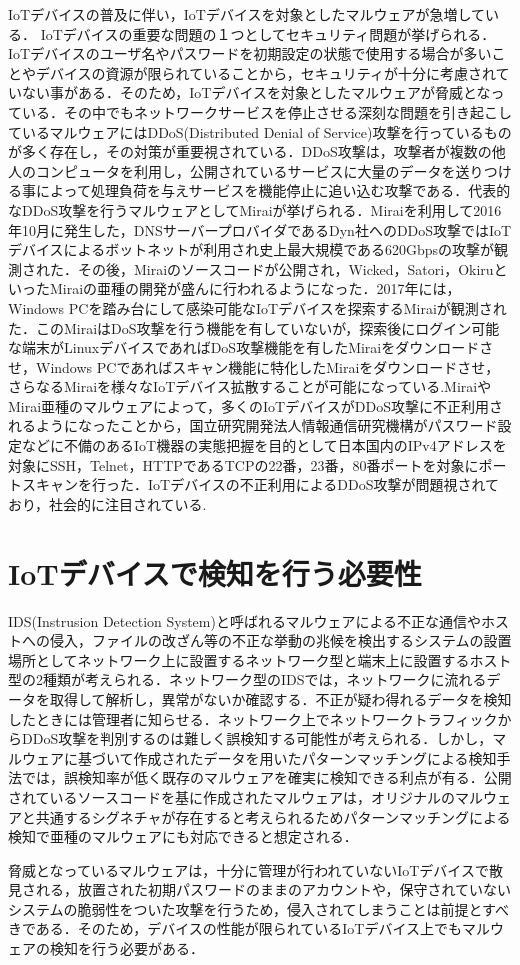 IoTデバイスの普及に伴い，IoTデバイスを対象としたマルウェアが急増している．
IoTデバイスの重要な問題の１つとしてセキュリティ問題が挙げられる．IoTデバイスのユーザ名やパスワードを初期設定の状態で使用する場合が多いことやデバイスの資源が限られていることから，セキュリティが十分に考慮されていない事がある．そのため，IoTデバイスを対象としたマルウェアが脅威となっている．その中でもネットワークサービスを停止させる深刻な問題を引き起こしているマルウェアにはDDoS(Distributed Denial of Service)攻撃を行っているものが多く存在し，その対策が重要視されている．DDoS攻撃は，攻撃者が複数の他人のコンピュータを利用し，公開されているサービスに大量のデータを送りつける事によって処理負荷を与えサービスを機能停止に追い込む攻撃である．代表的なDDoS攻撃を行うマルウェアとしてMiraiが挙げられる．Miraiを利用して2016年10月に発生した，DNSサーバープロバイダであるDyn社へのDDoS攻撃ではIoTデバイスによるボットネットが利用され史上最大規模である620Gbpsの攻撃が観測された\cite{Dyn}．その後，Miraiのソースコード\cite{code}が公開され，Wicked\cite{Wicked}，Satori\cite{Satori}，Okiru\cite{Okiru}といったMiraiの亜種の開発が盛んに行われるようになった．2017年には，Windows PCを踏み台にして感染可能なIoTデバイスを探索するMiraiが観測された\cite{newMirai}．このMiraiはDoS攻撃を行う機能を有していないが，探索後にログイン可能な端末がLinuxデバイスであればDoS攻撃機能を有したMiraiをダウンロードさせ，Windows PCであればスキャン機能に特化したMiraiをダウンロードさせ，さらなるMiraiを様々なIoTデバイス拡散することが可能になっている.MiraiやMirai亜種のマルウェアによって，多くのIoTデバイスがDDoS攻撃に不正利用されるようになったことから，国立研究開発法人情報通信研究機構がパスワード設定などに不備のあるIoT機器の実態把握を目的として日本国内のIPv4アドレスを対象にSSH，Telnet，HTTPであるTCPの22番，23番，80番ポートを対象にポートスキャンを行った\cite{国立}．IoTデバイスの不正利用によるDDoS攻撃が問題視されており，社会的に注目されている.

\section{IoTデバイスで検知を行う必要性}

IDS(Instrusion Detection System)と呼ばれるマルウェアによる不正な通信やホストへの侵入，ファイルの改ざん等の不正な挙動の兆候を検出するシステムの設置場所としてネットワーク上に設置するネットワーク型と端末上に設置するホスト型の2種類が考えられる．ネットワーク型のIDSでは，ネットワークに流れるデータを取得して解析し，異常がないか確認する．不正が疑わ得れるデータを検知したときには管理者に知らせる．ネットワーク上でネットワークトラフィックからDDoS攻撃を判別するのは難しく誤検知する可能性が考えられる．しかし，マルウェアに基づいて作成されたデータを用いたパターンマッチングによる検知手法では，誤検知率が低く既存のマルウェアを確実に検知できる利点が有る．公開されているソースコードを基に作成されたマルウェアは，オリジナルのマルウェアと共通するシグネチャが存在すると考えられるためパターンマッチングによる検知で亜種のマルウェアにも対応できると想定される．\par
脅威となっているマルウェアは，十分に管理が行われていないIoTデバイスで散見される，放置された初期パスワードのままのアカウントや，保守されていないシステムの脆弱性をついた攻撃を行うため，侵入されてしまうことは前提とすべきである．そのため，デバイスの性能が限られているIoTデバイス上でもマルウェアの検知を行う必要がある．

